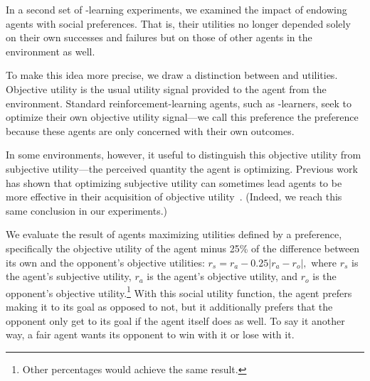 
In a second set of \Q-learning experiments, we examined the impact of
endowing agents with social preferences. That is, their
utilities no longer depended solely on their own successes and
failures but on those of other agents in the environment as
well.

To make this idea more precise, we draw a distinction
between  and  utilities.  Objective
utility is the usual utility signal provided to the agent from the
environment.
Standard reinforcement-learning agents, such as \Q-learners, seek to
optimize their own objective utility signal---we call this preference
the  preference because these agents are only concerned
with their own outcomes.

In some environments, however, it useful to distinguish this objective
utility from subjective utility---the perceived quantity the agent is
optimizing. Previous work has shown that optimizing subjective utility
can sometimes lead agents to be more effective in their acquisition of
objective utility~\cite{singh2009rewards}.  (Indeed, we reach this same
conclusion in our experiments.)


We evaluate the result of agents maximizing utilities defined
by a  preference, specifically the objective utility
of the agent minus 25\% of the difference between its own and the
opponent's objective utilities: $r_{s} = r_{a} - 0.25 \left| r_{a} -
r_{o} \right|,$ where $r_{s}$ is the agent's subjective utility,
$r_{a}$ is the agent's objective utility, and $r_{o}$ is the opponent's
objective utility.\footnote{Other percentages would achieve the same
result.}  
With this social utility function, the agent prefers making it to its
goal as opposed to not, but it additionally prefers that the opponent
only get to its goal if the agent itself does as well. To say it
another way, a fair agent wants its opponent to win with it or lose
with it.

